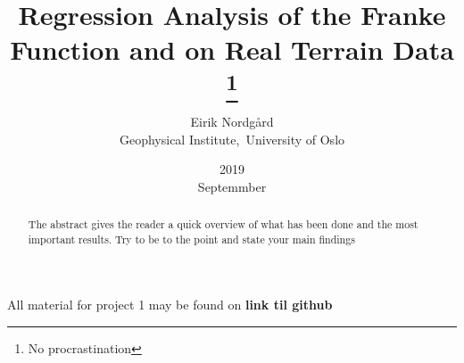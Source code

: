 \documentclass[12pt]{article}
\begin{document}
\title{Regression Analysis of the Franke Function and on Real Terrain Data \thanks{No procrastination}}
\date{2019\\ Septemmber}
\author{Eirik Nordgård\\ Geophysical Institute,\ University of Oslo}
\maketitle

\begin{abstract}
The abstract gives the reader a quick overview of what has been done and the most important results. Try to be to the point and state your main findings
\end{abstract}

All material for project 1 may be found on \textbf{link til github}
\pagebreak
\end{document}
